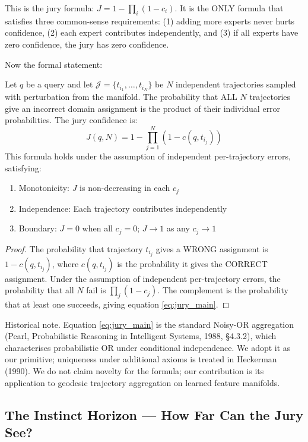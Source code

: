\documentclass[11pt]{article}
\begin{document}
This is the jury formula: $J = 1 - \prod_i (1-c_i)$. It is the ONLY
formula that satisfies three common-sense requirements: (1) adding more experts
never hurts confidence, (2) each expert contributes independently, and (3) if
all experts have zero confidence, the jury has zero confidence.

Now the formal statement:

\begin{theorem}\label{thm:jury}
Let $q$ be a query and let $\mathcal{J} = \{t_{i_1}, \ldots, t_{i_N}\}$ be $N$ independent trajectories sampled with perturbation from the manifold. The probability that ALL $N$ trajectories give an incorrect domain assignment is the product of their individual error probabilities. The jury confidence is:
\begin{equation}\label{eq:jury_main}
J(q, N) = 1 - \prod_{j=1}^{N} (1 - c(q, t_{i_j}))
\end{equation}
This formula holds under the assumption of independent per-trajectory errors, satisfying:
\begin{enumerate}[nosep,label=(\roman*)]
\item Monotonicity: $J$ is non-decreasing in each $c_j$
\item Independence: Each trajectory contributes independently
\item Boundary: $J = 0$ when all $c_j = 0$; $J \to 1$ as any $c_j \to 1$
\end{enumerate}
\end{theorem}
\begin{proof}
The probability that trajectory $t_{i_j}$ gives a WRONG assignment is $1 - c(q, t_{i_j})$, where $c(q, t_{i_j})$ is the probability it gives the CORRECT assignment. Under the assumption of independent per-trajectory errors, the probability that all $N$ fail is $\prod_j (1-c_j)$. The complement is the probability that at least one succeeds, giving equation \ref{eq:jury_main}.
\end{proof}

Historical note. Equation \ref{eq:jury_main} is the standard Noisy-OR aggregation (Pearl, Probabilistic Reasoning in Intelligent Systems, 1988, \S4.3.2), which characterises probabilistic OR under conditional independence. We adopt it as our primitive; uniqueness under additional axioms is treated in Heckerman (1990). We do not claim novelty for the formula; our contribution is its application to geodesic trajectory aggregation on learned feature manifolds.

\subsection{The Instinct Horizon --- How Far Can the Jury See?}
\end{document}
